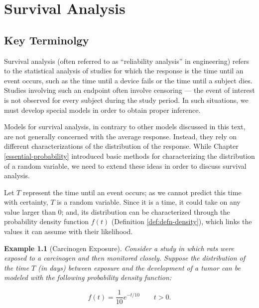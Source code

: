 \documentclass[
]{book}
\theoremstyle{plain}
\theoremstyle{mydefn}
\theoremstyle{myexmpl}
\newtheorem{example}{Example}[chapter]
\theoremstyle{remark}
\begin{document}
\hypertarget{part-survival-analysis}{%
\part{Survival Analysis}\label{part-survival-analysis}}

\hypertarget{surv-terminology}{%
\chapter{Key Terminolgy}\label{surv-terminology}}

Survival analysis (often referred to as ``reliability analysis'' in engineering) refers to the statistical analysis of studies for which the response is the time until an event occurs, such as the time until a device fails or the time until a subject dies. Studies involving such an endpoint often involve censoring --- the event of interest is not observed for every subject during the study period. In such situations, we must develop special models in order to obtain proper inference.

Models for survival analysis, in contrary to other models discussed in this text, are not generally concerned with the average response. Instead, they rely on different characterizations of the distribution of the response. While Chapter \ref{essential-probability} introduced basic methods for characterizing the distribution of a random variable, we need to extend these ideas in order to discuss survival analysis.

Let \(T\) represent the time until an event occurs; as we cannot predict this time with certainty, \(T\) is a random variable. Since it is a time, it could take on any value larger than 0; and, its distribution can be characterized through the probability density function \(f(t)\) (Definition \ref{def:defn-density}), which links the values it can assume with their likelihood.

\begin{example}[Carcinogen Exposure]
\protect\hypertarget{exm:surv-rats}{}{\label{exm:surv-rats} {} }Consider a study in which rats were exposed to a carcinogen and then monitored closely. Suppose the distribution of the time \(T\) (in days) between exposure and the development of a tumor can be modeled with the following probability density function:

\[f(t) = \frac{1}{10} e^{-t/10} \qquad t > 0.\]
\end{example}
\end{document}

